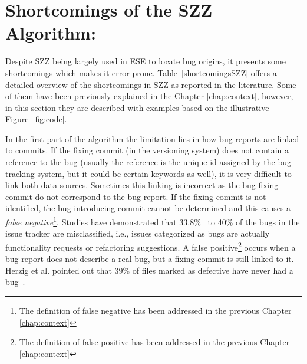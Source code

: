 \documentclass[a4paper, 12pt]{book}
\begin{document}
\section{Shortcomings of the SZZ Algorithm:}
\label{subsec:limitations}

Despite SZZ being largely used in ESE to locate bug origins, it presents some shortcomings which makes it error prone. Table~\ref{shortcomingsSZZ} offers a detailed overview of the shortcomings in SZZ as reported in the literature. Some of them have been previously explained in the Chapter \ref{chap:context}, however, in this section they are described with examples based on the illustrative Figure~\ref{fig:code}.

In the first part of the algorithm the limitation lies in how bug reports are linked to commits. If the fixing commit (in the versioning system) does not contain a reference to the bug (usually the reference is the unique id assigned by the bug tracking system, but it could be certain keywords as well), it is very difficult to link both data sources. Sometimes this linking is incorrect as the bug fixing commit do not correspond to the bug report. If the fixing commit is not identified, the bug-introducing commit cannot be determined and this causes a \emph{false negative}\footnote{The definition of false negative has been addressed in the previous Chapter \ref{chap:context}}. Studies have demonstrated that 33.8\%~\cite{herzig2013s} to 40\% \cite{rodriguez2016bugtracking} of the bugs in the issue tracker are misclassified, i.e., issues categorized as bugs are actually functionality requests or refactoring suggestions. A false positive\footnote{The definition of false positive has been addressed in the previous Chapter \ref{chap:context}} occurs when a bug report does not describe a real bug, but a fixing commit is still linked to it. Herzig et al. pointed out that 39\% of files marked as defective have never had a bug~\cite{herzig2013s}.

\end{document}
